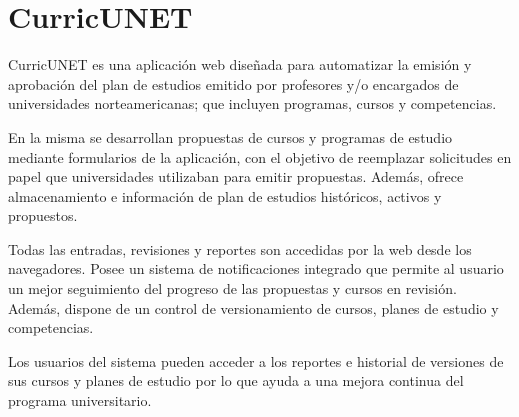 \section{CurricUNET}
CurricUNET es una aplicación web diseñada para automatizar la emisión y aprobación del plan de estudios emitido por profesores y/o encargados de universidades norteamericanas; que incluyen programas, cursos y competencias.

En la misma se desarrollan propuestas de cursos y programas de estudio mediante formularios de la aplicación, con el objetivo de reemplazar solicitudes en papel que universidades utilizaban para emitir propuestas. Además, ofrece almacenamiento e información de plan de estudios históricos, activos y propuestos.

Todas las entradas, revisiones y reportes son accedidas por la web desde los navegadores. Posee un sistema de notificaciones integrado que permite al usuario un mejor seguimiento del progreso de las propuestas y cursos en revisión. Además, dispone de un control de versionamiento de cursos, planes de estudio y competencias.

Los usuarios del sistema pueden acceder a los reportes e historial de versiones de sus cursos y planes de estudio por lo que ayuda a una mejora continua del programa universitario.